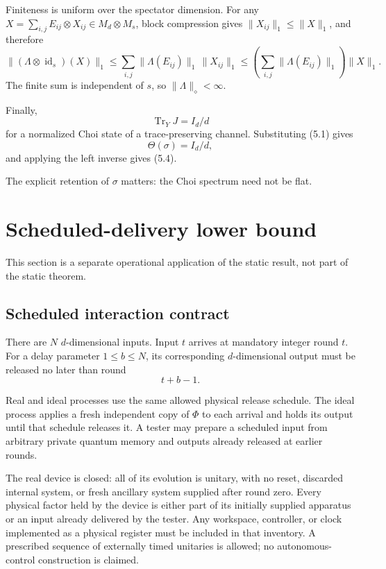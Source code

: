 \documentclass[11pt,a4paper]{article}
\numberwithin{equation}{section}
\begin{document}
Finiteness is uniform over the spectator dimension. For any
\(X=\sum_{i,j}E_{ij}\otimes X_{ij}\in M_d\otimes M_s\), block
compression gives \(\|X_{ij}\|_1\le\|X\|_1\), and therefore \[
\|(\Lambda\otimes\operatorname{id}_s)(X)\|_1
\le\sum_{i,j}\|\Lambda(E_{ij})\|_1\,\|X_{ij}\|_1
\le\left(\sum_{i,j}\|\Lambda(E_{ij})\|_1\right)\|X\|_1.
\] The finite sum is independent of \(s\), so
\(\|\Lambda\|_\diamond<\infty\).

Finally, \[
\operatorname{Tr}_YJ=I_d/d
\] for a normalized Choi state of a trace-preserving channel.
Substituting (5.1) gives \[
\Theta(\sigma)=I_d/d,
\] and applying the left inverse gives (5.4).

The explicit retention of \(\sigma\) matters: the Choi spectrum need not
be flat.

\section{Scheduled-delivery lower
bound}\label{scheduled-delivery-lower-bound}

This section is a separate operational application of the static result,
not part of the static theorem.

\subsection*{Scheduled interaction
contract}\label{scheduled-interaction-contract}

There are \(N\) \(d\)-dimensional inputs. Input \(t\) arrives at
mandatory integer round \(t\). For a delay parameter \(1\le b\le N\),
its corresponding \(d\)-dimensional output must be released no later
than round \[
t+b-1.
\]

Real and ideal processes use the same allowed physical release schedule.
The ideal process applies a fresh independent copy of \(\Phi\) to each
arrival and holds its output until that schedule releases it. A tester
may prepare a scheduled input from arbitrary private quantum memory and
outputs already released at earlier rounds.

The real device is closed: all of its evolution is unitary, with no
reset, discarded internal system, or fresh ancillary system supplied
after round zero. Every physical factor held by the device is either
part of its initially supplied apparatus or an input already delivered
by the tester. Any workspace, controller, or clock implemented as a
physical register must be included in that inventory. A prescribed
sequence of externally timed unitaries is allowed; no autonomous-control
construction is claimed.
\end{document}
